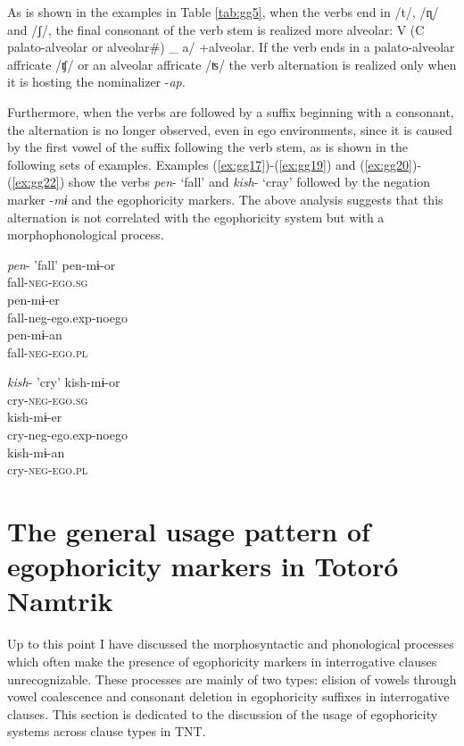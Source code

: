 \documentclass[output=paper]{langsci/langscibook}
\begin{document}
As is shown in the examples in Table \ref{tab:gg5}, when the verbs end in /t/, /ɳ/ and /ʃ/, the final consonant of the verb stem is realized more alveolar: V (C palato-alveolar or alveolar\#) \_ a/ +alveolar. If the verb ends in a palato-alveolar affricate /ʧ/ or an alveolar affricate /ʦ/ the verb alternation is realized only when it is hosting the nominalizer -\textit{ap}.

Furthermore, when the verbs are followed by a suffix beginning with a consonant, the alternation is no longer observed, even in ego environments, since it is caused by the first vowel of the suffix following the verb stem, as is shown in the following sets of examples. 
Examples (\ref{ex:gg17})-(\ref{ex:gg19}) and (\ref{ex:gg20})-(\ref{ex:gg22}) show the verbs \textit{pen}- ‘fall’ and \textit{kish}- ‘cray’ followed by the negation marker -\textit{mɨ} and the egophoricity markers. The above analysis suggests that this alternation is not correlated with the egophoricity system but with a morphophonological process. 

\ea \textit{pen}- 'fall' 
	\ea \label{ex:gg17}
    \gll pen-mɨ-or\\
         fall-\textsc{neg-ego.sg}\\
  \ex \label{ex:gg18}
    \gll pen-mɨ-er\\
         fall-neg-ego.exp-noego\\
   \ex \label{ex:gg19}
   \gll pen-mɨ-an\\
   fall-\textsc{neg-ego.pl}\\
\z \z

\ea \textit{kish}- 'cry' 
	\ea \label{ex:gg20}
    \gll kish-mɨ-or\\
         cry-\textsc{neg-ego.sg}\\
  \ex \label{ex:gg21}
    \gll kish-mɨ-er\\
         cry-neg-ego.exp-noego\\
   \ex \label{ex:gg22}
   \gll kish-mɨ-an\\
   cry-\textsc{neg-ego.pl}\\
\z \z



\section{The general usage pattern of egophoricity markers in Totoró Namtrik}\label{s:gg3}


Up to this point I have discussed the morphosyntactic and phonological processes which often make the presence of egophoricity markers in interrogative clauses unrecognizable. These processes are mainly of two types: elision of vowels through vowel coalescence and consonant deletion in egophoricity suffixes in interrogative clauses. This section is dedicated to the discussion of the usage of egophoricity systems across clause types in TNT. 
\end{document}
